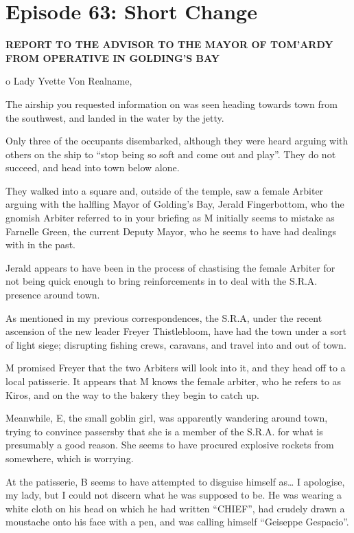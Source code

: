 \section{Episode 63: Short Change}

\medskip

\textbf{REPORT TO THE ADVISOR TO THE MAYOR OF TOM’ARDY FROM OPERATIVE IN GOLDING’S BAY}\medskip

o Lady Yvette Von Realname,\medskip

The airship you requested information on was seen heading towards town from the southwest, and landed in the water by the jetty.\medskip

Only three of the occupants disembarked, although they were heard arguing with others on the ship to “stop being so soft and come out and play”. They do not succeed, and head into town below alone.\medskip

They walked into a square and, outside of the temple, saw a female Arbiter arguing with the halfling Mayor of Golding’s Bay, Jerald Fingerbottom, who the gnomish Arbiter referred to in your briefing as M initially seems to mistake as Farnelle Green, the current Deputy Mayor, who he seems to have had dealings with in the past.\medskip

Jerald appears to have been in the process of chastising the female Arbiter for not being quick enough to bring reinforcements in to deal with the S.R.A. presence around town.\medskip

As mentioned in my previous correspondences, the S.R.A, under the recent ascension of the new leader Freyer Thistlebloom, have had the town under a sort of light siege; disrupting fishing crews, caravans, and travel into and out of town.\medskip

M promised Freyer that the two Arbiters will look into it, and they head off to a local patisserie. It appears that M knows the female arbiter, who he refers to as Kiros, and on the way to the bakery they begin to catch up.\medskip

Meanwhile, E, the small goblin girl, was apparently wandering around town, trying to convince passersby that she is a member of the S.R.A. for what is presumably a good reason. She seems to have procured explosive rockets from somewhere, which is worrying.\medskip

At the patisserie, B seems to have attempted to disguise himself as… I apologise, my lady, but I could not discern what he was supposed to be. He was wearing a white cloth on his head on which he had written “CHIEF”, had crudely drawn a moustache onto his face with a pen, and was calling himself “Geiseppe Gespacio”.\medskip

